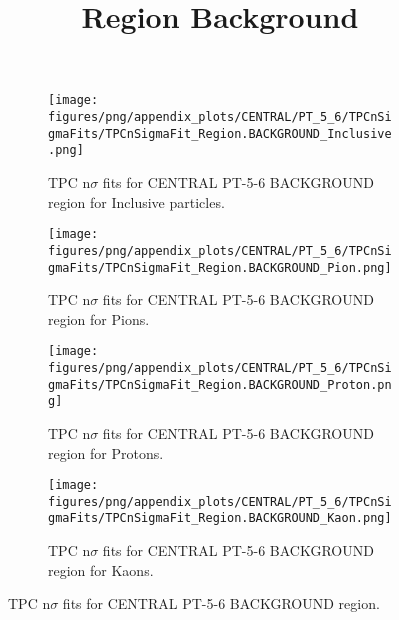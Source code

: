             \begin{figure}[H]
                \title{Region Background}
                \begin{subfigure}[b]{0.5\textwidth}
                    \centering
                    \texttt{[image: figures/png/appendix\_plots/CENTRAL/PT\_5\_6/TPCnSigmaFits/TPCnSigmaFit\_Region.BACKGROUND\_Inclusive.png]}
                    \caption{TPC n$\sigma$ fits for CENTRAL PT-5-6 BACKGROUND region for Inclusive particles.}
                    \label{fig:appendix_CENTRAL_PT-5-6_BACKGROUND_Inclusive}
                \end{subfigure}
                \begin{subfigure}[b]{0.5\textwidth}
                    \centering
                    \texttt{[image: figures/png/appendix\_plots/CENTRAL/PT\_5\_6/TPCnSigmaFits/TPCnSigmaFit\_Region.BACKGROUND\_Pion.png]}
                    \caption{TPC n$\sigma$ fits for CENTRAL PT-5-6 BACKGROUND region for Pions.}
                    \label{fig:appendix_CENTRAL_PT-5-6_BACKGROUND_Pion}
                \end{subfigure}
                \begin{subfigure}[b]{0.5\textwidth}
                    \centering
                    \texttt{[image: figures/png/appendix\_plots/CENTRAL/PT\_5\_6/TPCnSigmaFits/TPCnSigmaFit\_Region.BACKGROUND\_Proton.png]}
                    \caption{TPC n$\sigma$ fits for CENTRAL PT-5-6 BACKGROUND region for Protons.}
                    \label{fig:appendix_CENTRAL_PT-5-6_BACKGROUND_Proton}
                \end{subfigure}
                \begin{subfigure}[b]{0.5\textwidth}
                    \centering
                    \texttt{[image: figures/png/appendix\_plots/CENTRAL/PT\_5\_6/TPCnSigmaFits/TPCnSigmaFit\_Region.BACKGROUND\_Kaon.png]}
                    \caption{TPC n$\sigma$ fits for CENTRAL PT-5-6 BACKGROUND region for Kaons.}
                    \label{fig:appendix_CENTRAL_PT-5-6_BACKGROUND_Kaon}
                \end{subfigure}
                \caption{TPC n$\sigma$ fits for CENTRAL PT-5-6 BACKGROUND region.}
                \label{fig:appendix_CENTRAL_PT-5-6_BACKGROUND}
            \end{figure}
            \clearpage
            
    
